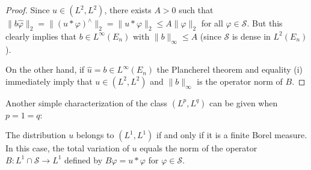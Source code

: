 \begin{proof}
Since $u \in (L^{2}, L^{2})$, there exists $A > 0$ such that
$\|b\hat{\varphi}\|_{2} = \|(u * \varphi)^{\wedge}\|_{2} = \|u * \varphi\|_{2} \leq A\|\varphi\|_{2}$
for all $\varphi \in \mathscr{S}$. But this clearly implies that
$b \in L^{\infty}(E_{n})$ with $\|b\|_{\infty} \leq A$ (since $\mathscr{S}$ is
dense in $L^{2}(E_{n})$).

On the other hand, if $\hat{u} = b \in L^{\infty}(E_{n})$ the Plancherel
theorem and equality (i) immediately imply that $u \in (L^{2}, L^{2})$ and
$\|b\|_{\infty}$ is the operator norm of $B$.
\end{proof}

Another simple characterization of the class $(L^{p}, L^{q})$ can be given
when $p = 1 = q$:

\begin{theorem}\label{thm:c1-3-19}
The distribution $u$ belongs to $(L^{1}, L^{1})$ if and only if it is a finite
Borel measure. In this case, the total variation of $u$ equals the norm of the
operator $B\colon L^{1} \cap \mathscr{S} \to L^{1}$ defined by
$B\varphi = u * \varphi$ for $\varphi \in \mathscr{S}$.
\end{theorem}

